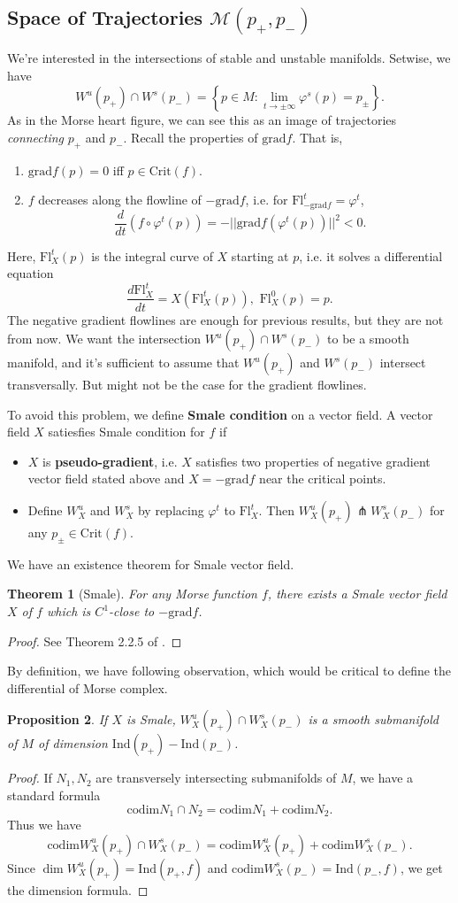 \documentclass{article}
\newtheorem{theorem}{Theorem}[section]
\newtheorem{proposition}[theorem]{Proposition}
\newcommand{\vp}{\varphi}
\newcommand{\M}{\mathcal{M}}
\newcommand{\tcap}{\pitchfork}
\newcommand{\Crit}{\mathrm{Crit}}
\newcommand{\grad}{\mathrm{grad}}
\newcommand{\Ind}{\mathrm{Ind}}
\newcommand{\Fl}{\mathrm{Fl}}
\newcommand{\codim}{\mathrm{codim}}
\begin{document}
\subsection{Space of Trajectories $\M(p_+,p_-)$}

We're interested in the intersections of stable and unstable manifolds.
Setwise, we have
	$$W^u(p_+)\cap W^s(p_-)=\left\{p\in M:\lim_{t\to\pm\infty}\vp^s(p)=p_{\pm}\right\}.$$
As in the Morse heart figure, we can see this as an image of trajectories \emph{connecting} $p_+$ and $p_-$.
Recall the properties of $\grad f$. That is,
	\begin{enumerate}
	\item $\grad f(p)=0$ iff $p\in\Crit(f)$.
	\item $f$ decreases along the flowline of $-\grad f$, i.e. for $\Fl^t_{-\grad f}=\vp^t$,
		$$\frac{d}{dt}(f\circ\vp^t(p))=-||\grad f(\vp^t(p))||^2<0.$$
	\end{enumerate}
Here, $\Fl^t_X(p)$ is the integral curve of $X$ starting at $p$, i.e. it solves a differential equation
	$$\frac{d\Fl^t_X}{dt}=X(\Fl^t_X(p)),\,\,\Fl^0_X(p)=p.$$
The negative gradient flowlines are enough for previous results, but they are not from now.
We want the intersection $W^u(p_+)\cap W^s(p_-)$ to be a smooth manifold, and it's sufficient to assume that $W^u(p_+)$ and $W^s(p_-)$ intersect transversally.
But might not be the case for the gradient flowlines.

To avoid this problem, we define \textbf{Smale condition} on a vector field.
A vector field $X$ satiesfies Smale condition for $f$ if
	\begin{itemize}
	\item $X$ is \textbf{pseudo-gradient}, i.e. $X$ satisfies two properties of negative gradient vector field stated above and $X=-\grad f$ near the critical points.
	\item Define $W^u_X$ and $W^s_X$ by replacing $\vp^t$ to $\Fl^t_X$.
	Then $W^u_X(p_+)\tcap W^s_X(p_-)$ for any $p_\pm\in\Crit(f)$.
	\end{itemize}
We have an existence theorem for Smale vector field.
	\begin{theorem}[Smale]\rm
	For any Morse function $f$, there exists a Smale vector field $X$ of $f$ which is $C^1$-close to $-\grad f$.
	\end{theorem}
		\begin{proof}
		See Theorem 2.2.5 of \cite{ad}.
		\end{proof}
By definition, we have following observation, which would be critical to define the differential of Morse complex.
	\begin{proposition}\rm
	If $X$ is Smale, $W^u_X(p_+)\cap W^s_X(p_-)$ is a smooth submanifold of $M$ of dimension $\Ind(p_+)-\Ind(p_-)$.
	\end{proposition}
		\begin{proof}
		If $N_1,N_2$ are transversely intersecting submanifolds of $M$, we have a standard formula
			$$\codim N_1\cap N_2=\codim N_1+\codim N_2.$$
		Thus we have
			$$\codim W^u_X(p_+)\cap W^s_X(p_-)=\codim W^u_X(p_+)+\codim W^s_X(p_-).$$
		Since $\dim W^u_X(p_+)=\Ind(p_+,f)$ and $\codim W^s_X(p_-)=\Ind(p_-,f)$, we get the dimension formula.
		\end{proof}
\end{document}
